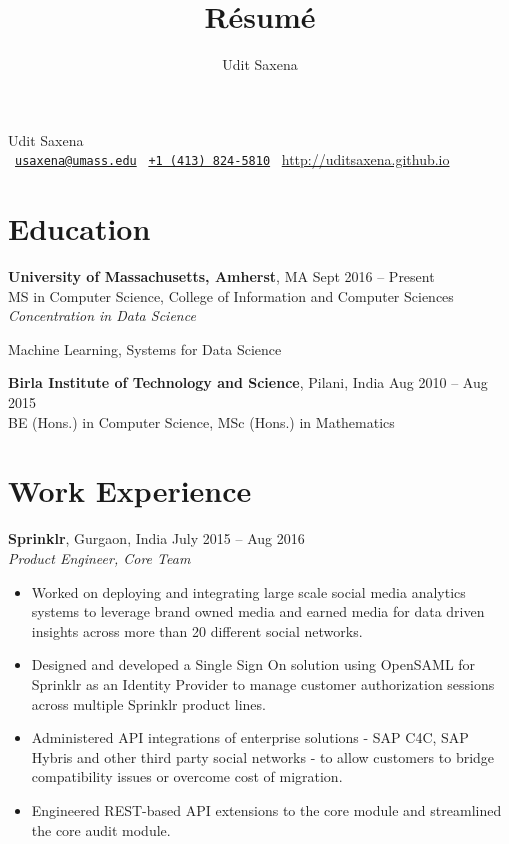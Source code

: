 \documentclass[letterpaper]{article}
\title{R\'esum\'e}
\author{Udit Saxena}
\begin{document}
\pagecolor{white}
\begin{center}
\huge
Udit Saxena\\
\small
\faEnvelope~\href{mailto:usaxena@umass.edu}{\nolinkurl{usaxena@umass.edu}}
\faPhone~\href{tel:14138245810}{\texttt{+1 (413) 824-5810}}
\faGlobe~\url{http://uditsaxena.github.io}
\normalsize
\end{center}

\section*{Education}
\vspace{-1mm}
\textbf{University of Massachusetts, Amherst}, MA \hfill Sept 2016 --
    Present\\
MS in Computer Science, College of Information and Computer Sciences
\\\emph{Concentration in Data Science}
\vspace{-2mm}
\begin{description}[leftmargin=!, labelwidth=\widthof{Coursework },
        font=\normalfont]
    \item[Coursework:] Machine Learning,
                        Systems for Data Science
\end{description}
\vspace{-0.5mm}
\textbf{Birla Institute of Technology and Science}, Pilani, India \hfill
    Aug 2010 -- Aug 2015\\
BE (Hons.) in Computer Science,
MSc (Hons.) in Mathematics

\section*{Work Experience}
\textbf{Sprinklr}, Gurgaon, India \hfill July 2015 -- Aug 2016\\
\emph{Product Engineer, Core Team}\\
\vspace{-6mm}
\begin{itemize}
\item Worked on deploying and integrating large scale social media analytics systems to leverage brand owned media and earned media for data driven insights across more than 20 different social networks.
\vspace{-2mm}
\item Designed and developed a Single Sign On solution using OpenSAML for Sprinklr as an Identity Provider to manage customer authorization sessions across multiple Sprinklr product lines.
\vspace{-2mm}
\item Administered API integrations of enterprise solutions - SAP C4C, SAP Hybris and other third party social networks - to allow customers to bridge compatibility issues or overcome cost of migration. 
\vspace{-2mm}
\item Engineered REST-based API extensions to the core module and streamlined the core audit module.
\end{itemize}
\end{document}
